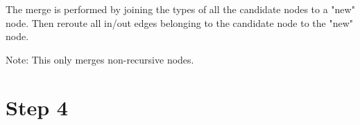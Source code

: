 The merge is performed by joining the types
of all the candidate nodes to a "new" node. Then reroute all
in/out edges belonging to the candidate
node to the "new" node.

Note: This only merges non-recursive nodes.

\section{Step 4}
%
%
